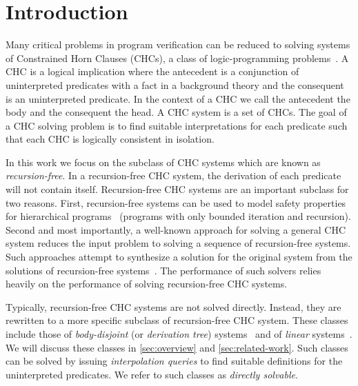 \section{Introduction}
\label{sec:intro}
Many critical problems in program verification can be reduced to
solving systems of Constrained Horn Clauses (CHCs), a class of
logic-programming
problems~\cite{bjorner13,flanagan03,rummer13a,rummer13b}.
%
A CHC is a logical implication where the antecedent is a conjunction
of uninterpreted predicates with a fact in a background
theory and the consequent is an uninterpreted predicate. 
%
In the context of a CHC we call the antecedent the body and the
consequent the head.  A CHC system is a set of CHCs. 
%
The goal of a CHC solving problem is to find suitable interpretations
for each predicate such that each CHC is logically
consistent in isolation.

In this work we focus on the subclass of CHC systems which are known
as \emph{recursion-free}. In a recursion-free CHC system, the
derivation of each predicate will not contain
itself. 
%
Recursion-free CHC systems are an important subclass for two reasons.
%
First, recursion-free systems can be used to model safety properties
for hierarchical programs~\cite{lal-qadeer15,lal-qadeer-lahiri12}
(programs with only bounded iteration and recursion).
%
Second and most importantly, a well-known approach for solving a
general CHC system reduces the input problem to solving a sequence
of recursion-free systems.
%
Such approaches attempt to synthesize a solution for the   original
system from the solutions of recursion-free systems~\cite{bjorner13}.
%
The performance of such solvers relies
heavily on the performance of solving recursion-free CHC systems.
%

Typically, recursion-free CHC systems are not solved directly.
%
Instead, they are rewritten to a more specific subclass of
recursion-free CHC system.
%
These classes include those of
\emph{body-disjoint} (or \emph{derivation tree})
systems~\cite{heizmann10,bjorner13,mcmillan14,rummer13a,rummer13b} and
of \emph{linear} systems~\cite{albarghouthi12a}.
%
We will discuss these classes in \autoref{sec:overview} and
\autoref{sec:related-work}.
%
Such classes can be solved by issuing
\emph{interpolation queries} to find suitable definitions for the
uninterpreted predicates.
%
We refer to such classes as \emph{directly solvable}.

